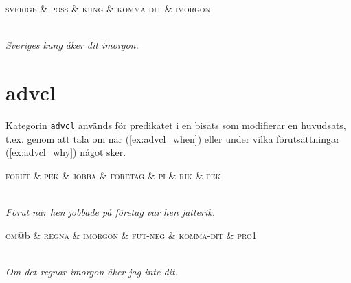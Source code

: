 \documentclass[11pt,a4paper]{article}
\begin{document}
\begin{example}
\label{ex:case_poss}
\begin{dependency}[theme = simple]
   \begin{deptext}[column sep=1em]
      \textsc{sverige} \& \textsc{poss} \& \textsc{kung} \& \textsc{komma-dit} \& \textsc{imorgon} \\
   \end{deptext}
\end{dependency}
\\
\textit{Sveriges kung åker dit imorgon.}
\end{example}

\section{advcl}
\label{sec:advcl}
Kategorin \texttt{advcl} används för predikatet i en bisats som modifierar en huvudsats, t.ex. genom att tala om när (\ref{ex:advcl_when}) eller under vilka förutsättningar (\ref{ex:advcl_why}) något sker.

\begin{example}
\label{ex:advcl_when}
\begin{dependency}[theme = simple]
   \begin{deptext}[column sep=1em]
      \textsc{förut} \& \textsc{pek} \& \textsc{jobba} \& \textsc{företag} \& \textsc{pi} \& \textsc{rik} \& \textsc{pek} \\
   \end{deptext}
\end{dependency}
\\
\textit{Förut när hen jobbade på företag var hen jätterik.}
\end{example}

\begin{example}
\label{ex:advcl_why}
\begin{dependency}[theme = simple]
   \begin{deptext}[column sep=1em]
      \textsc{om}@b \& \textsc{regna} \& \textsc{imorgon} \& \textsc{fut-neg} \& \textsc{komma-dit} \& \textsc{pro1}  \\
   \end{deptext}
\end{dependency}
\\
\textit{Om det regnar imorgon åker jag inte dit.}
\end{example}
\end{document}
